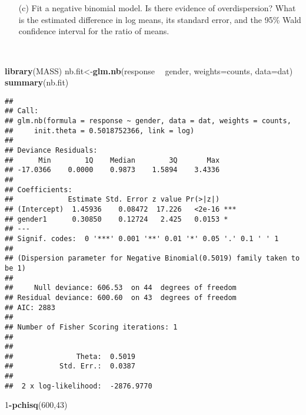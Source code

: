 \documentclass[]{article}
\newenvironment{Shaded}{\begin{snugshade}}{\end{snugshade}}
\newcommand{\KeywordTok}[1]{\textcolor[rgb]{0.13,0.29,0.53}{\textbf{#1}}}
\newcommand{\DataTypeTok}[1]{\textcolor[rgb]{0.13,0.29,0.53}{#1}}
\newcommand{\DecValTok}[1]{\textcolor[rgb]{0.00,0.00,0.81}{#1}}
\newcommand{\StringTok}[1]{\textcolor[rgb]{0.31,0.60,0.02}{#1}}
\newcommand{\OperatorTok}[1]{\textcolor[rgb]{0.81,0.36,0.00}{\textbf{#1}}}
\newcommand{\NormalTok}[1]{#1}
\begin{document}
~

\begin{itemize}
     \item[] \vspace{1.5 in} 

 \end{itemize}

~

\begin{itemize}
     \item[(c)] Fit a negative binomial model.  Is there evidence of overdispersion? What is the estimated difference in log means, its standard error, and the 95\% Wald confidence interval for the ratio of means. 

 \end{itemize}

~

\begin{Shaded}
\begin{Highlighting}[]
\KeywordTok{library}\NormalTok{(MASS)}
\NormalTok{nb.fit<-}\KeywordTok{glm.nb}\NormalTok{(response }\OperatorTok{~}\StringTok{ }\NormalTok{gender, }\DataTypeTok{weights=}\NormalTok{counts, }\DataTypeTok{data=}\NormalTok{dat)}
\KeywordTok{summary}\NormalTok{(nb.fit)}
\end{Highlighting}
\end{Shaded}

\begin{verbatim}
## 
## Call:
## glm.nb(formula = response ~ gender, data = dat, weights = counts, 
##     init.theta = 0.5018752366, link = log)
## 
## Deviance Residuals: 
##      Min        1Q    Median        3Q       Max  
## -17.0366    0.0000    0.9873    1.5894    3.4336  
## 
## Coefficients:
##             Estimate Std. Error z value Pr(>|z|)    
## (Intercept)  1.45936    0.08472  17.226   <2e-16 ***
## gender1      0.30850    0.12724   2.425   0.0153 *  
## ---
## Signif. codes:  0 '***' 0.001 '**' 0.01 '*' 0.05 '.' 0.1 ' ' 1
## 
## (Dispersion parameter for Negative Binomial(0.5019) family taken to be 1)
## 
##     Null deviance: 606.53  on 44  degrees of freedom
## Residual deviance: 600.60  on 43  degrees of freedom
## AIC: 2883
## 
## Number of Fisher Scoring iterations: 1
## 
## 
##               Theta:  0.5019 
##           Std. Err.:  0.0387 
## 
##  2 x log-likelihood:  -2876.9770
\end{verbatim}

\begin{Shaded}
\begin{Highlighting}[]
\DecValTok{1}\OperatorTok{-}\KeywordTok{pchisq}\NormalTok{(}\DecValTok{600}\NormalTok{,}\DecValTok{43}\NormalTok{)}
\end{Highlighting}
\end{Shaded}
\end{document}

